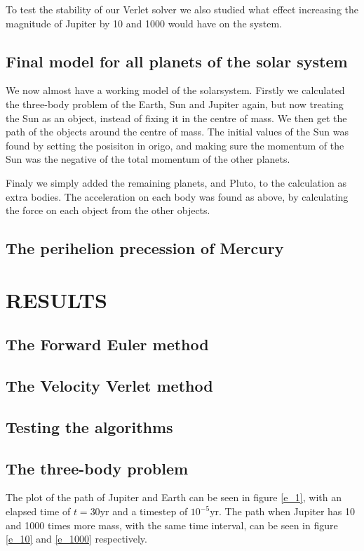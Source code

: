 \documentclass[a4paper]{article}
\begin{document}
To test the stability of our Verlet solver we also studied what effect increasing the magnitude of Jupiter by 10 and 1000 would have on the system.

\subsection{Final model for all planets of the solar system}
We now almost have a working model of the solarsystem. Firstly we calculated the three-body problem of the Earth, Sun and Jupiter again, but now treating the Sun as an object, instead of fixing it in the centre of mass. We then get the path of the objects around the centre of mass. The initial values of the Sun was found by setting the posisiton in origo, and making sure the momentum of the Sun was the negative of the total momentum of the other planets. 

Finaly we simply added the remaining planets, and Pluto, to the calculation as extra bodies. The acceleration on each body was found as above, by calculating the force on each object from the other objects. 


\subsection{The perihelion precession of Mercury}



\section{RESULTS}

\subsection{The Forward Euler method}

\subsection{The Velocity Verlet method}

\subsection{Testing the algorithms}

\subsection{The three-body problem}
The plot of the path of Jupiter and Earth can be seen in figure \ref{e_1}, with an elapsed time of $t=30\text{yr}$ and a timestep of $10^{-5} \text{yr}$. The path when Jupiter has 10 and 1000 times more mass, with the same time interval, can be seen in figure \ref{e_10} and \ref{e_1000} respectively. 
\end{document}
